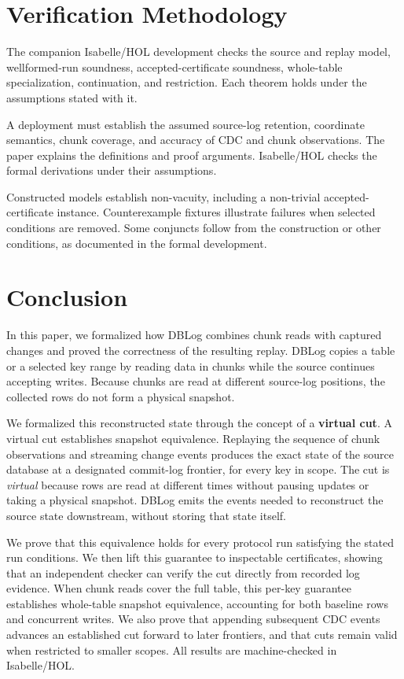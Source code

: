 \documentclass[letterpaper,10pt,twocolumn]{article}
\begin{document}
\section{Verification Methodology}\label{verification-methodology}

The companion Isabelle/HOL development checks the source and replay model,
wellformed-run soundness, accepted-certificate soundness, whole-table
specialization, continuation, and restriction. Each theorem holds under
the assumptions stated with it.

A deployment must establish the assumed source-log retention, coordinate
semantics, chunk coverage, and accuracy of CDC and chunk observations.
The paper explains the definitions and proof arguments. Isabelle/HOL
checks the formal derivations under their assumptions.

Constructed models establish non-vacuity, including a non-trivial
accepted-certificate instance. Counterexample fixtures illustrate failures
when selected conditions are removed. Some conjuncts follow from the
construction or other conditions, as documented in the formal development.

\section{Conclusion}\label{conclusion}

In this paper, we formalized how DBLog combines chunk reads with captured
changes and proved the correctness of the resulting replay.
DBLog copies a table or a selected key range by reading
data in chunks while the source continues accepting writes. Because chunks are 
read at different source-log positions, the collected rows do not form a physical 
snapshot.

We formalized this reconstructed state through the concept of a \textbf{virtual cut}. 
A virtual cut establishes snapshot equivalence. Replaying the sequence of chunk 
observations and streaming change events produces the exact state of the source database at 
a designated commit-log frontier, for every key in scope. The cut is \emph{virtual} because 
rows are read at different times without pausing updates or taking a physical snapshot.
DBLog emits the events needed to reconstruct the source state downstream,
without storing that state itself.

We prove that this equivalence holds for every protocol run satisfying 
the stated run conditions. We then lift this guarantee 
to inspectable certificates, showing that an independent checker can verify 
the cut directly from recorded log evidence. When chunk reads cover the full 
table, this per-key guarantee establishes whole-table snapshot equivalence, 
accounting for both baseline rows and concurrent writes. We also prove that 
appending subsequent CDC events advances an established cut forward to later 
frontiers, and that cuts remain valid when restricted to smaller scopes. All 
results are machine-checked in Isabelle/HOL.
\end{document}
